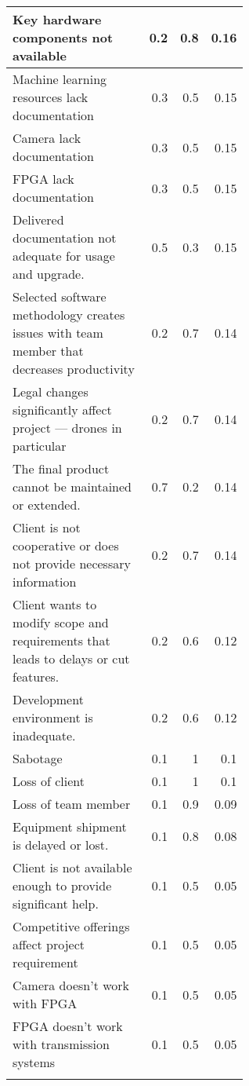 \begin{center}
\begin{longtable}{p{0.6\linewidth} *{3}{r}}
Key hardware components not available & 0.2 & 0.8 & 0.16\\ \hline
Machine learning resources lack documentation & 0.3 & 0.5 & 0.15\\ \hline
Camera lack documentation & 0.3 & 0.5 & 0.15\\ \hline
FPGA lack documentation & 0.3 & 0.5 & 0.15\\ \hline
Delivered documentation not adequate for usage and upgrade. & 0.5 & 0.3 & 0.15\\ \hline
Selected software methodology creates issues with team member that decreases productivity & 0.2 & 0.7 & 0.14\\ \hline
Legal changes significantly affect project --- drones in particular & 0.2 & 0.7 & 0.14\\ \hline
The final product cannot be maintained or extended. & 0.7 & 0.2 & 0.14\\ \hline
Client is not cooperative or does not provide necessary information & 0.2 & 0.7 & 0.14\\ \hline
Client wants to modify scope and requirements that leads to delays or cut features. & 0.2 & 0.6 & 0.12\\ \hline
Development environment is inadequate. & 0.2 & 0.6 & 0.12\\ \hline
Sabotage & 0.1 & 1 & 0.1\\ \hline
Loss of client & 0.1 & 1 & 0.1\\ \hline
Loss of team member & 0.1 & 0.9 & 0.09\\ \hline
Equipment shipment is delayed or lost. & 0.1 & 0.8 & 0.08\\ \hline
Client is not available enough to provide significant help. & 0.1 & 0.5 & 0.05\\ \hline
Competitive offerings affect project requirement & 0.1 & 0.5 & 0.05\\ \hline
Camera doesn’t work with FPGA & 0.1 & 0.5 & 0.05\\ \hline
FPGA doesn’t work with transmission systems & 0.1 & 0.5 & 0.05\\ \hline
\label{riskprofile}
\end{longtable}
\end{center}
